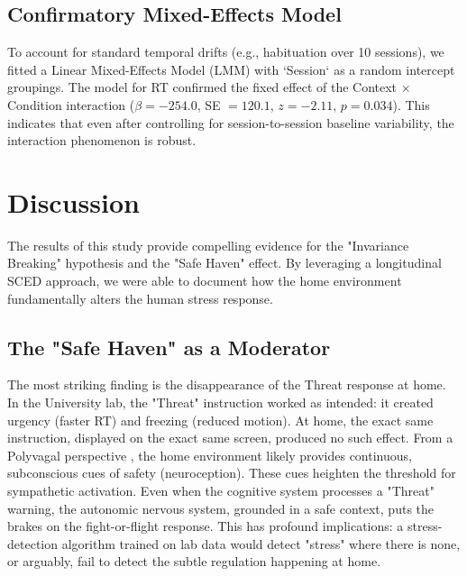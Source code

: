 \documentclass[journal]{IEEEtran}
\begin{document}
\subsection{Confirmatory Mixed-Effects Model}
To account for standard temporal drifts (e.g., habituation over 10 sessions), we fitted a Linear Mixed-Effects Model (LMM) with `Session` as a random intercept groupings.
The model for RT confirmed the fixed effect of the Context $\times$ Condition interaction ($\beta = -254.0$, SE $= 120.1$, $z = -2.11$, $p = 0.034$). This indicates that even after controlling for session-to-session baseline variability, the interaction phenomenon is robust.

\section{Discussion}

The results of this study provide compelling evidence for the "Invariance Breaking" hypothesis and the "Safe Haven" effect. By leveraging a longitudinal SCED approach, we were able to document how the home environment fundamentally alters the human stress response.

\subsection{The "Safe Haven" as a Moderator}
The most striking finding is the disappearance of the Threat response at home. In the University lab, the "Threat" instruction worked as intended: it created urgency (faster RT) and freezing (reduced motion). At home, the exact same instruction, displayed on the exact same screen, produced no such effect.
From a Polyvagal perspective \cite{porges_safe_haven}, the home environment likely provides continuous, subconscious cues of safety (neuroception). These cues heighten the threshold for sympathetic activation. Even when the cognitive system processes a "Threat" warning, the autonomic nervous system, grounded in a safe context, puts the brakes on the fight-or-flight response. This has profound implications: a stress-detection algorithm trained on lab data would detect "stress" where there is none, or arguably, fail to detect the subtle regulation happening at home.
\end{document}
